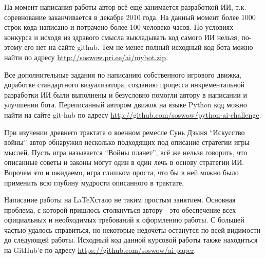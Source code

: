 \documentclass[12pt]{report}
\begin{document}
На момент написания работы автор всё ещё занимается разработкой ИИ, т.к. соревнование заканчивается в декабре 2010 года. На данный момент более 1000 строк кода написано и потрачено более 100 человеко-часов. По условиях конкурса и исходя из здравого смысла выкладывать код самого ИИ нельзя, по-этому его нет на сайте github. Тем не менее полный исходный код бота можно найти по адресу \url{http://soswow.pri.ee/ai/mybot.zip}.

Все дополнительные задания по написанию собственного игрового движка, доработке стандартного визуализатора, созданию процесса инкрементальной разработки ИИ были выполнены и безусловно помогли автору в написании и улучшении бота. Переписанный автором движок на языке Python код можно найти на сайте git-hub по адресу \url{http://github.com/soswow/python-ai-challenge}.

При изучении древнего трактата о военном ремесле Сунь Дзыня ``Искусство войны'' автор обнаружил несколько подходящих под описание стратегии игры мыслей. Пусть игра называется ``Войны планет'', всё же нельзя говорить, что описанные советы и законы могут один в один лечь в основу стратегии ИИ. Впрочем это и ожидаемо, игра слишком проста, что бы в ней можно было применить всю глубину мудрости описанного в трактате.

Написание работы на \LaTeX стало не таким простым занятием. Основная проблема, с которой пришлось столкнуться автору - это обеспечение всех официальных и необходимых требований к оформлению работы. С большей частью удалось справиться, но некоторые недочёты останутся по всей видимости до следующей работы. Исходный код данной курсовой работы также находиться на GitHub'е по адресу \url{https://github.com/soswow/ai-paper}.

\clearpage
{}



\end{document}
